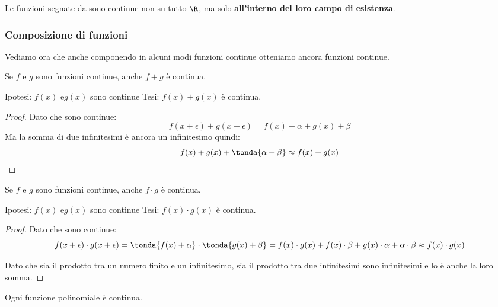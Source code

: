 \begin{osservazione}
Le funzioni segnate da \textasteriskcentered sono continue non su tutto \(\R\), 
ma solo \textbf{all'interno del loro campo di esistenza}.
\end{osservazione}

\subsubsection{Composizione di funzioni}
\label{subsubsec:cont_composizionefunzioni}

Vediamo ora che anche componendo in alcuni modi funzioni continue otteniamo 
ancora funzioni continue.

\begin{teorema}
Se \(f\) e \(g\) sono funzioni continue, anche \(f+g\) è continua.
\end{teorema}

\noindent Ipotesi: 
\(f(x) \text{ e} g(x)\) sono continue
\tab Tesi: 
\(f(x)+g(x)\) è continua.

\begin{proof}
Dato che sono continue: 
\[f(x+\epsilon) + g(x+\epsilon) = f(x)+\alpha + g(x)+\beta\]
Ma la somma di due infinitesimi è ancora un infinitesimo quindi:
\[f(x)+g(x)+\tonda{\alpha + \beta} \approx f(x)+g(x)\]
\end{proof}

\begin{teorema}
Se \(f\) e \(g\) sono funzioni continue, anche \(f \cdot g\) è continua.
\end{teorema}

\noindent Ipotesi: 
\(f(x) \text{ e} g(x)\) sono continue
\tab Tesi: 
\(f(x) \cdot g(x)\) è continua.

\begin{proof}
Dato che sono continue: 
\[f(x+\epsilon) \cdot g(x+\epsilon) = 
\tonda{f(x)+\alpha} \cdot \tonda{g(x)+\beta} = 
f(x) \cdot g(x) + f(x) \cdot \beta + g(x) \cdot \alpha + \alpha \cdot \beta
\approx f(x) \cdot g(x)\]

Dato che sia il prodotto tra un numero finito e un infinitesimo, sia il 
prodotto tra due infinitesimi sono infinitesimi e lo è anche la loro somma. 
\end{proof}

\begin{corollario}
 Ogni funzione polinomiale è continua.
\end{corollario}

